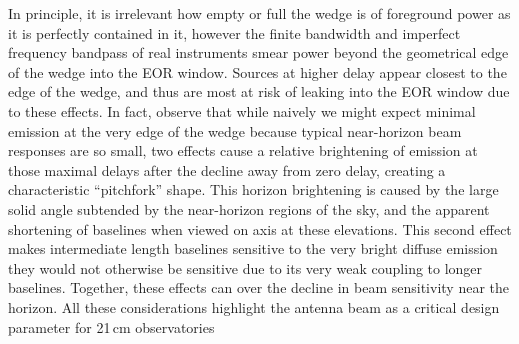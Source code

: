 \documentclass{emulateapj}
\begin{document}

In principle, it is irrelevant how empty or full the wedge is of foreground power as it is 
perfectly contained in it, however the finite bandwidth and imperfect frequency bandpass 
of real instruments smear power beyond the geometrical edge of the wedge into the EOR 
window. Sources at higher delay appear closest to the edge of the wedge, and thus are 
most at risk of leaking into the EOR window due to these effects. In fact, 
\citet{nithya15,nithya15b} observe that while naively we might expect minimal emission 
at the very edge of the wedge because typical near-horizon beam responses are so small, 
two effects cause a relative brightening of emission at those maximal delays after the 
decline away from zero delay, creating a characteristic ``pitchfork'' shape. This horizon 
brightening is caused by the large solid angle subtended by the near-horizon regions of the 
sky, and the apparent shortening of baselines when viewed on axis at these elevations. 
This second effect makes intermediate length baselines sensitive to the very bright diffuse 
emission they would not otherwise be sensitive due to its very weak coupling to longer 
baselines. Together, these effects can over the decline in beam sensitivity near the horizon. 
All these considerations highlight the antenna beam as a critical design parameter for 
21\,cm observatories
\end{document}
